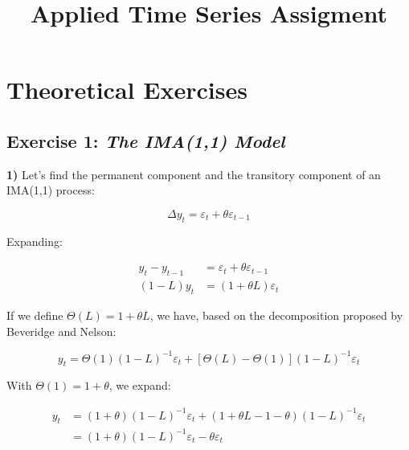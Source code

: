 \documentclass[
  a4paper]{article}
\title{Applied Time Series Assigment}
\author{}
\date{}
\renewcommand*\contentsname{Table of contents}
\newcommand\contentsname{Table of contents}
\begin{document}
\maketitle
\ifdefined\Shaded\renewenvironment{Shaded}{\begin{tcolorbox}[borderline west={3pt}{0pt}{shadecolor}, enhanced, interior hidden, boxrule=0pt, frame hidden, sharp corners, breakable]}{\end{tcolorbox}}\fi

\renewcommand*\contentsname{Table of contents}
{
\hypersetup{linkcolor=}
\setcounter{tocdepth}{4}
\tableofcontents
}
\hypertarget{theoretical-exercises}{%
\section{Theoretical Exercises}\label{theoretical-exercises}}

\hypertarget{exercise-1-the-ima11-model}{%
\subsection{\texorpdfstring{Exercise 1: \emph{The IMA(1,1)
Model}}{Exercise 1: The IMA(1,1) Model}}\label{exercise-1-the-ima11-model}}

\textbf{1)} Let's find the permanent component and the transitory
component of an IMA(1,1) process:

\[
\Delta y_t = \varepsilon_t + \theta \varepsilon_{t-1}
\]

Expanding:

\begin{align*}
y_t - y_{t-1} & = \varepsilon_t + \theta \varepsilon_{t-1} \\
(1 - L)y_t & = (1 + \theta L) \varepsilon_t
\end{align*}

If we define \(\Theta(L) = 1 + \theta L\), we have, based on the
decomposition proposed by Beveridge and Nelson:

\[
y_t = \Theta(1)(1 - L)^{-1} \varepsilon_t + [\Theta(L) - \Theta(1)](1 - L)^{-1}\varepsilon_t
\]

With \(\Theta(1) = 1 + \theta\), we expand:

\begin{align*}
y_t & = (1 + \theta)(1 - L)^{-1} \varepsilon_t + (1 + \theta L - 1 - \theta)(1 - L)^{-1}\varepsilon_t \\    
& = (1 + \theta)(1 - L)^{-1} \varepsilon_t - \theta \varepsilon_t
\end{align*}
\end{document}
